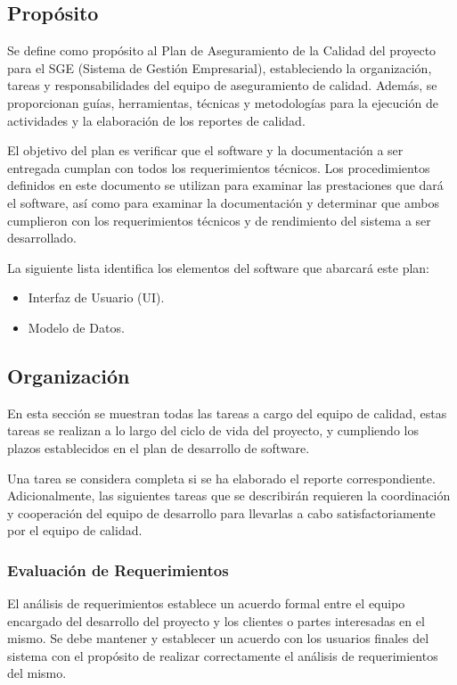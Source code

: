 \documentclass[a4paper,10pt]{article}
\begin{document}
	\subsection{Propósito}
	Se define como propósito al Plan de Aseguramiento de la Calidad del proyecto para el SGE (Sistema de Gestión Empresarial), estableciendo la organización, tareas y responsabilidades del equipo de aseguramiento de calidad. Además, se proporcionan guías, herramientas, técnicas y metodologías para la ejecución de actividades y la elaboración de los reportes de calidad.
	
	El objetivo del plan es verificar que el software y la documentación a ser entregada cumplan con todos los requerimientos técnicos. Los procedimientos definidos en este documento se utilizan para examinar las prestaciones que dará el software, así como para examinar la documentación y determinar que ambos cumplieron con los requerimientos técnicos y de rendimiento del sistema a ser desarrollado.
	
	La siguiente lista identifica los elementos del software que abarcará este plan:
	\begin{itemize}
		\item Interfaz de Usuario (UI).
		\item Modelo de Datos.
	\end{itemize}
	
	\subsection{Organización}
	En esta sección se muestran todas las tareas a cargo del equipo de calidad, estas tareas se realizan a lo largo del ciclo de vida del proyecto, y cumpliendo los plazos establecidos en el plan de desarrollo de software.
	
	Una tarea se considera completa si se ha elaborado el reporte correspondiente. Adicionalmente, las siguientes tareas que se describirán requieren la coordinación y cooperación del equipo de desarrollo para llevarlas a cabo satisfactoriamente por el equipo de calidad.
	
	\subsubsection{Evaluación de Requerimientos}
	El análisis de requerimientos establece un acuerdo formal entre el equipo encargado del desarrollo del proyecto y los clientes o partes interesadas en el mismo. Se debe mantener y establecer un acuerdo con los usuarios finales del sistema con el propósito de realizar correctamente el análisis de requerimientos del mismo.
	
\end{document}
